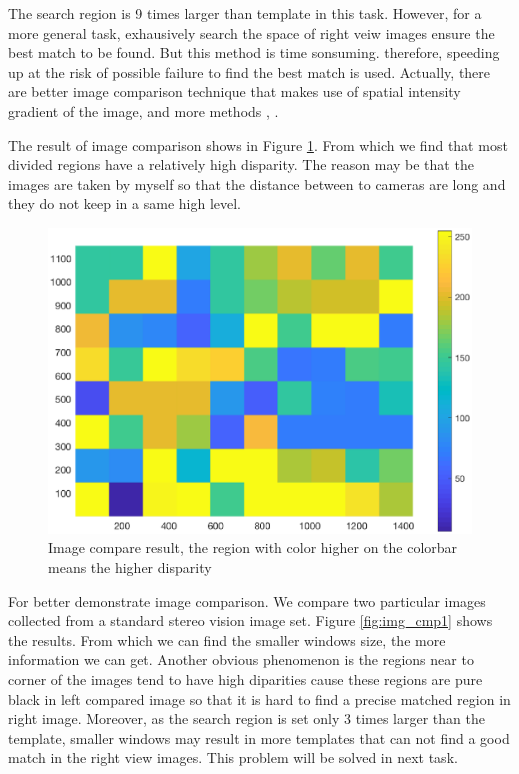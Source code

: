 The search region is 9 times larger than template in this task. However, for a more general task, exhausively search the space of right veiw images ensure the best match to be found. But this method is time sonsuming. therefore, speeding up at the risk of possible failure to find the best match is used. Actually, there are better image comparison technique that makes use of spatial intensity gradient of the image\cite{Lucas1981An}, and more methods \cite{Marr1988A}, \cite{Moravec1980Obstacle}.

The result of image comparison shows in Figure \ref{fig:img_cmp}. From which we find that most divided regions have a relatively high disparity. The reason may be that the images are taken by myself so that the distance between to cameras are long and they do not keep in a same high level.

\begin{figure}[h!]
	\centering
	\includegraphics[width=0.5\linewidth]{figures/part2/img_cmp}
	\caption{Image compare result, the region with color higher on the colorbar means the higher disparity}
	\label{fig:img_cmp}
\end{figure}

For better demonstrate image comparison. We compare two particular images collected from a standard stereo vision image set. Figure \ref{fig:img_cmp1} shows the results. From which we can find the smaller windows size, the more information we can get. Another obvious phenomenon is the regions near to corner of the images tend to have high diparities cause these regions are pure black in left compared image so that it is hard to find a precise matched region in right image. Moreover, as the search region is set only 3 times larger than the template, smaller windows may result in more templates that can not find a good match in the right view images. This problem will be solved in next task.

